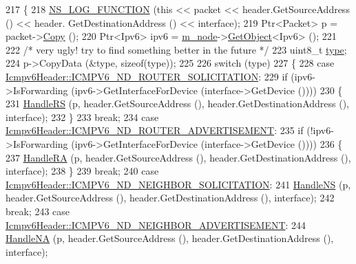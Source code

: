 \begin{DoxyCode}
217 \{
218   \hyperlink{log-macros-disabled_8h_a90b90d5bad1f39cb1b64923ea94c0761}{NS\_LOG\_FUNCTION} (\textcolor{keyword}{this} << packet << header.GetSourceAddress () << header.
      GetDestinationAddress () << interface);
219   Ptr<Packet> p = packet->\hyperlink{classns3_1_1Packet_a5d5c70802a5f77fc5f0001e0cfc1898b}{Copy} ();
220   Ptr<Ipv6> ipv6 = \hyperlink{classns3_1_1Icmpv6L4Protocol_a8968d1631f94f0b1cc1fd0e71ea0d0fe}{m\_node}->\hyperlink{classns3_1_1Object_a13e18c00017096c8381eb651d5bd0783}{GetObject}<Ipv6> ();
221 
222   \textcolor{comment}{/* very ugly! try to find something better in the future */}
223   uint8\_t \hyperlink{visualizer-ideas_8txt_add98db9e15e2a58cf2b57623e7aa893a}{type};
224   p->CopyData (&type, \textcolor{keyword}{sizeof}(type));
225 
226   \textcolor{keywordflow}{switch} (type)
227     \{
228     \textcolor{keywordflow}{case} \hyperlink{classns3_1_1Icmpv6Header_ad13fcbee075bf00f66ffbc57dfbecb70a8620b40d78b2bf3cc1fe4b3a555de671}{Icmpv6Header::ICMPV6\_ND\_ROUTER\_SOLICITATION}:
229       \textcolor{keywordflow}{if} (ipv6->IsForwarding (ipv6->GetInterfaceForDevice (interface->GetDevice ())))
230         \{
231           \hyperlink{classns3_1_1Icmpv6L4Protocol_a5ad8cee1b6e1884f9c833fc09ff4f4e8}{HandleRS} (p, header.GetSourceAddress (), header.GetDestinationAddress (), interface);
232         \}
233       \textcolor{keywordflow}{break};
234     \textcolor{keywordflow}{case} \hyperlink{classns3_1_1Icmpv6Header_ad13fcbee075bf00f66ffbc57dfbecb70a3b4761cf875ed921c977c877f804dbf4}{Icmpv6Header::ICMPV6\_ND\_ROUTER\_ADVERTISEMENT}:
235       \textcolor{keywordflow}{if} (!ipv6->IsForwarding (ipv6->GetInterfaceForDevice (interface->GetDevice ())))
236         \{
237           \hyperlink{classns3_1_1Icmpv6L4Protocol_af1a56b5658c12d34615aa712758359d5}{HandleRA} (p, header.GetSourceAddress (), header.GetDestinationAddress (), interface);
238         \}
239       \textcolor{keywordflow}{break};
240     \textcolor{keywordflow}{case} \hyperlink{classns3_1_1Icmpv6Header_ad13fcbee075bf00f66ffbc57dfbecb70ad34550bf091d453d25f2f9e2df2594e0}{Icmpv6Header::ICMPV6\_ND\_NEIGHBOR\_SOLICITATION}:
241       \hyperlink{classns3_1_1Icmpv6L4Protocol_acec910926a1fdbbea699c10d638aa704}{HandleNS} (p, header.GetSourceAddress (), header.GetDestinationAddress (), interface);
242       \textcolor{keywordflow}{break};
243     \textcolor{keywordflow}{case} \hyperlink{classns3_1_1Icmpv6Header_ad13fcbee075bf00f66ffbc57dfbecb70a702ff072042857f6e5d2b118aad703b2}{Icmpv6Header::ICMPV6\_ND\_NEIGHBOR\_ADVERTISEMENT}:
244       \hyperlink{classns3_1_1Icmpv6L4Protocol_a6c3a2ecce98fa29743eb177b613490e5}{HandleNA} (p, header.GetSourceAddress (), header.GetDestinationAddress (), interface);

\end{DoxyCode}
